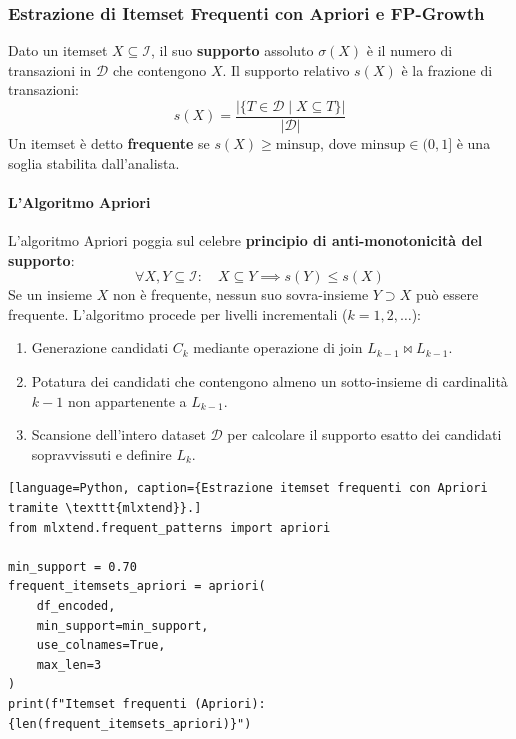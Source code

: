 \FloatBarrier
\subsubsection{Estrazione di Itemset Frequenti con Apriori e FP-Growth}
\label{subsec:lab-apriori-fpgrowth}

\begin{definition}
Dato un itemset $X \subseteq \mathcal{I}$, il suo \textbf{supporto} assoluto $\sigma(X)$ è il numero di transazioni in $\mathcal{D}$ che contengono $X$. Il supporto relativo $s(X)$ è la frazione di transazioni:
\begin{equation}
    s(X) = \frac{|\{T \in \mathcal{D} \mid X \subseteq T\}|}{|\mathcal{D}|}
\end{equation}
Un itemset è detto \textbf{frequente} se $s(X) \ge \text{minsup}$, dove $\text{minsup} \in (0, 1]$ è una soglia stabilita dall'analista.
\end{definition}

\paragraph{L'Algoritmo Apriori}
L'algoritmo Apriori \cite{agrawal1994} poggia sul celebre \textbf{principio di anti-monotonicità del supporto}:
\begin{equation}
    \forall X, Y \subseteq \mathcal{I}: \quad X \subseteq Y \implies s(Y) \le s(X)
\end{equation}
Se un insieme $X$ non è frequente, nessun suo sovra-insieme $Y \supset X$ può essere frequente. L'algoritmo procede per livelli incrementali ($k = 1, 2, \dots$):
\begin{enumerate}
    \item Generazione candidati $C_k$ mediante operazione di join $L_{k-1} \bowtie L_{k-1}$.
    \item Potatura dei candidati che contengono almeno un sotto-insieme di cardinalità $k-1$ non appartenente a $L_{k-1}$.
    \item Scansione dell'intero dataset $\mathcal{D}$ per calcolare il supporto esatto dei candidati sopravvissuti e definire $L_k$.
\end{enumerate}

\begin{lstlisting}[language=Python, caption={Estrazione itemset frequenti con Apriori tramite \texttt{mlxtend}}.]
from mlxtend.frequent_patterns import apriori

min_support = 0.70
frequent_itemsets_apriori = apriori(
    df_encoded, 
    min_support=min_support, 
    use_colnames=True, 
    max_len=3
)
print(f"Itemset frequenti (Apriori): {len(frequent_itemsets_apriori)}")
\end{lstlisting}

